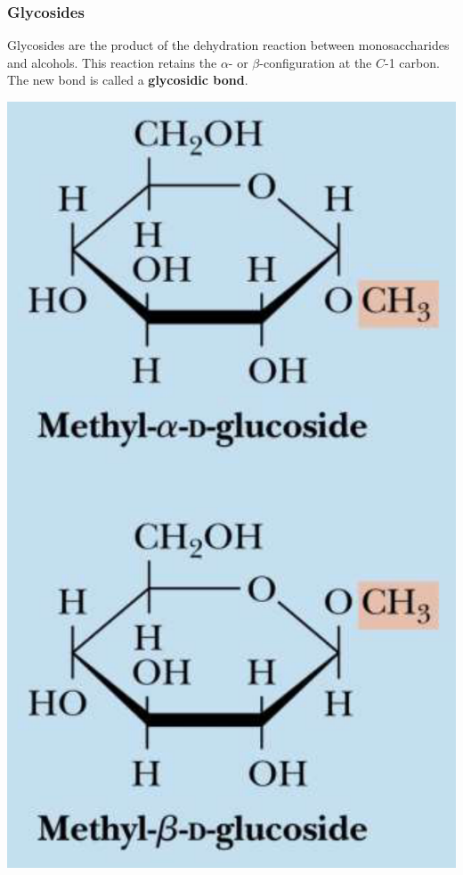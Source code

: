 \documentclass[11pt]{article}
\begin{document}
\newpage

\subsubsection{Glycosides}
\label{sec:orge502a35}
Glycosides are the product of the dehydration reaction between monosaccharides and alcohols. This reaction retains the \(\alpha\)- or \(\beta\)-configuration at the \(C\)-1 carbon. The new bond is called a \textbf{glycosidic bond}.

\begin{center}
\includegraphics[scale=0.75]{./images/glycosides.png}
\end{center}
\end{document}
